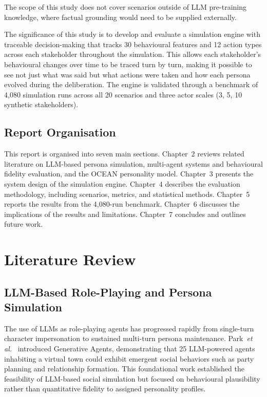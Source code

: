 \documentclass[12pt, a4paper]{report}
\newcommand{\etal}{\textit{et al.}}
\begin{document}
The scope of this study does not cover scenarios outside of LLM pre-training knowledge, where factual grounding would need to be supplied externally.

The significance of this study is to develop and evaluate a simulation engine with traceable decision-making that tracks 30 behavioural features and 12 action types across each stakeholder throughout the simulation. This allows each stakeholder's behavioural changes over time to be traced turn by turn, making it possible to see not just what was said but what actions were taken and how each persona evolved during the deliberation. The engine is validated through a benchmark of 4,080 simulation runs across all 20 scenarios and three actor scales (3, 5, 10 synthetic stakeholders).

\section{Report Organisation}

This report is organised into seven main sections. Chapter~2 reviews related literature on LLM-based persona simulation, multi-agent systems and behavioural fidelity evaluation, and the OCEAN personality model. Chapter~3 presents the system design of the simulation engine. Chapter~4 describes the evaluation methodology, including scenarios, metrics, and statistical methods. Chapter~5 reports the results from the 4,080-run benchmark. Chapter~6 discusses the implications of the results and limitations. Chapter~7 concludes and outlines future work.


\chapter{Literature Review}

\section{LLM-Based Role-Playing and Persona Simulation}

The use of LLMs as role-playing agents has progressed rapidly from single-turn character impersonation to sustained multi-turn persona maintenance. Park~\etal~\cite{park2023generative} introduced Generative Agents, demonstrating that 25 LLM-powered agents inhabiting a virtual town could exhibit emergent social behaviors such as party planning and relationship formation. This foundational work established the feasibility of LLM-based social simulation but focused on behavioural plausibility rather than quantitative fidelity to assigned personality profiles.
\end{document}
